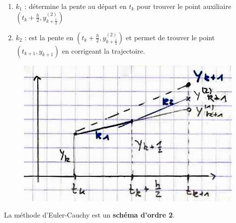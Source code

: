 \begin{enumerate}[label=-]
    \item $k_1$ : détermine la pente au départ en $t_k$ pour trouver le point auxiliaire $(t_k + \frac{h}{2},y_{k+\frac{1}{2}}^{(2)})$

    \item $k_2$ : est la pente en $(t_k + \frac{h}{2}, y_{k+\frac{1}{2}}^{(2)})$ et permet de trouver
        le point $(t_{k+1},y_{k+1})$ en corrigeant la trajectoire.

\end{enumerate}
    \begin{figure}
        \centering
        \includegraphics[scale=0.42]{5-EDO-eulercauch.png}
    \end{figure}

La méthode d'Euler-Cauchy est un \textbf{schéma d'ordre 2}.

